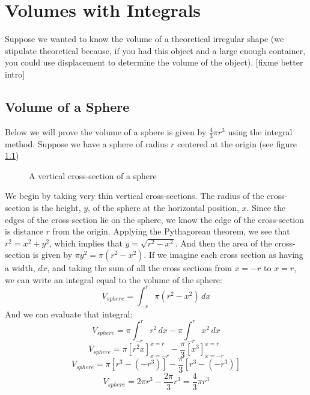 \chapter{Volumes with Integrals}
Suppose we wanted to know the volume of a theoretical irregular shape (we 
stipulate theoretical because, if you had this object and a large enough 
container, you could use displacement to determine the volume of the object). 
[fixme better intro]

\section{Volume of a Sphere}
Below we will prove the volume of a sphere is given by $\frac{4}{3}\pi r^3$ 
using the integral method. Suppose we have a sphere of radius $r$ centered at 
the origin (see figure \ref{fig:sphere})

\begin{figure}[htbp]
\centering
    \caption{A vertical cross-section of a sphere}
    \label{fig:sphere}
\end{figure}

We begin by taking very thin vertical cross-sections. The radius of the 
cross-section is the height, $y$, of the sphere at the horizontal position, 
$x$. Since the edges of the cross-section lie on the sphere, we know the edge 
of the cross-section is distance $r$ from the origin. Applying the Pythagorean 
theorem, we see that $r^2 = x^2 + y^2$, which implies that $y = \sqrt{r^2 - x^2
}$. And then the area of the cross-section is given by $\pi y^2 = \pi (r^2 - x^
2)$. If we imagine each cross section as having a width, $dx$, and taking the 
sum of all the cross sections from $x = -r$ to $x = r$, we can write an 
integral equal to the volume of the sphere:
$$V_{sphere} = \int_{-r}^{r} \pi (r^2 - x^2)\,dx$$
And we can evaluate that integral:
$$V_{sphere} = \pi \int_{-r}^{r} r^2\,dx - \pi \int_{-r}^{r} x^2\,dx$$
$$V_{sphere} = \pi \left[ r^2 x \right] _{x = -r}^{x = r} - \frac{\pi}{3} \left[
x^3 \right] _{x = -r}^{x = r} $$
$$V_{sphere} = \pi \left[ r^3 - (-r^3) \right] - \frac{\pi}{3} \left[r^3 - (-r^
3) \right]$$
$$V_{sphere} = 2 \pi r^3 - \frac{2\pi}{3} r^3 = \frac{4}{3}\pi r^3$$

